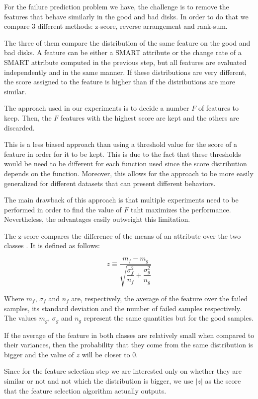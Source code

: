 For the failure prediction problem we have, the challenge is to remove the features that behave similarly in the good and bad disks.
In order to do that we compare 3 different methods: z-score, reverse arrangement and rank-sum.

The three of them compare the distribution of the same feature on the good and bad disks.
A feature can be either a SMART attribute or the change rate of a SMART attribute computed in the previous step, but all features are evaluated independently and in the same manner.
If these distributions are very different, the score assigned to the feature is higher than if the distributions are more similar.

The approach used in our experiments is to decide a number $F$ of features to keep.
Then, the $F$ features with the highest score are kept and the others are discarded.

This is a less biased approach than using a threshold value for the score of a feature in order for it to be kept.
This is due to the fact that these thresholds would be need to be different for each function used since the score distribution depends on the function.
Moreover, this allows for the approach to be more easily generalized for different datasets that can present different behaviors.

The main drawback of this approach is that multiple experiments need to be performed in order to find the value of $F$ taht maximizes the performance.
Nevertheless, the advantages easily outweight this limitation.

The z-score compares the difference of the means of an attribute over the two classes \cite{Murray2005}.
It is defined as follows:

\begin{equation}
  z \equiv \dfrac{m_f - m_g}{\sqrt{\dfrac{\sigma_f^2}{n_f} + \dfrac{\sigma_g^2}{n_g}}}
\end{equation}

Where $m_f$, $\sigma_f$ and $n_f$ are, respectively, the average of the feature over the failed samples, its standard deviation and the number of failed samples respectively. 
The values $m_g$, $\sigma_g$ and $n_g$ represent the same quantities but for the good samples.

If the average of the feature in both classes are relatively small when compared to their variances, then the probability that they come from the same distribution is bigger and the value of $z$ will be closer to 0.

Since for the feature selection step we are interested only on whether they are similar or not and not which the distribution is bigger, we use $|z|$ as the score that the feature selection algorithm actually outputs.


